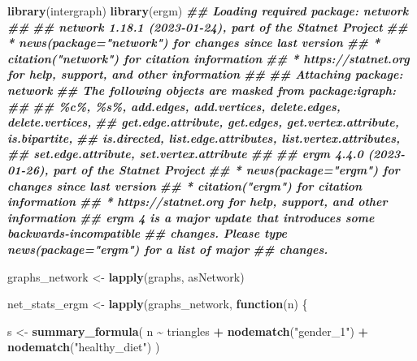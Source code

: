 \documentclass[
]{book}
\newenvironment{Shaded}{\begin{snugshade}}{\end{snugshade}}
\newcommand{\ControlFlowTok}[1]{\textcolor[rgb]{0.13,0.29,0.53}{\textbf{#1}}}
\newcommand{\DocumentationTok}[1]{\textcolor[rgb]{0.56,0.35,0.01}{\textbf{\textit{#1}}}}
\newcommand{\FunctionTok}[1]{\textcolor[rgb]{0.13,0.29,0.53}{\textbf{#1}}}
\newcommand{\NormalTok}[1]{#1}
\newcommand{\OtherTok}[1]{\textcolor[rgb]{0.56,0.35,0.01}{#1}}
\newcommand{\SpecialCharTok}[1]{\textcolor[rgb]{0.81,0.36,0.00}{\textbf{#1}}}
\newcommand{\StringTok}[1]{\textcolor[rgb]{0.31,0.60,0.02}{#1}}
\begin{document}
\begin{Shaded}
\begin{Highlighting}[]
\FunctionTok{library}\NormalTok{(intergraph)}
\FunctionTok{library}\NormalTok{(ergm)}
\DocumentationTok{\#\# Loading required package: network}
\DocumentationTok{\#\# }
\DocumentationTok{\#\# \textquotesingle{}network\textquotesingle{} 1.18.1 (2023{-}01{-}24), part of the Statnet Project}
\DocumentationTok{\#\# * \textquotesingle{}news(package="network")\textquotesingle{} for changes since last version}
\DocumentationTok{\#\# * \textquotesingle{}citation("network")\textquotesingle{} for citation information}
\DocumentationTok{\#\# * \textquotesingle{}https://statnet.org\textquotesingle{} for help, support, and other information}
\DocumentationTok{\#\# }
\DocumentationTok{\#\# Attaching package: \textquotesingle{}network\textquotesingle{}}
\DocumentationTok{\#\# The following objects are masked from \textquotesingle{}package:igraph\textquotesingle{}:}
\DocumentationTok{\#\# }
\DocumentationTok{\#\#     \%c\%, \%s\%, add.edges, add.vertices, delete.edges, delete.vertices,}
\DocumentationTok{\#\#     get.edge.attribute, get.edges, get.vertex.attribute, is.bipartite,}
\DocumentationTok{\#\#     is.directed, list.edge.attributes, list.vertex.attributes,}
\DocumentationTok{\#\#     set.edge.attribute, set.vertex.attribute}
\DocumentationTok{\#\# }
\DocumentationTok{\#\# \textquotesingle{}ergm\textquotesingle{} 4.4.0 (2023{-}01{-}26), part of the Statnet Project}
\DocumentationTok{\#\# * \textquotesingle{}news(package="ergm")\textquotesingle{} for changes since last version}
\DocumentationTok{\#\# * \textquotesingle{}citation("ergm")\textquotesingle{} for citation information}
\DocumentationTok{\#\# * \textquotesingle{}https://statnet.org\textquotesingle{} for help, support, and other information}
\DocumentationTok{\#\# \textquotesingle{}ergm\textquotesingle{} 4 is a major update that introduces some backwards{-}incompatible}
\DocumentationTok{\#\# changes. Please type \textquotesingle{}news(package="ergm")\textquotesingle{} for a list of major}
\DocumentationTok{\#\# changes.}

\NormalTok{graphs\_network }\OtherTok{\textless{}{-}} \FunctionTok{lapply}\NormalTok{(graphs, asNetwork)}

\NormalTok{net\_stats\_ergm }\OtherTok{\textless{}{-}} \FunctionTok{lapply}\NormalTok{(graphs\_network, }\ControlFlowTok{function}\NormalTok{(n) \{}
  
\NormalTok{  s }\OtherTok{\textless{}{-}} \FunctionTok{summary\_formula}\NormalTok{(}
\NormalTok{    n }\SpecialCharTok{\textasciitilde{}}\NormalTok{ triangles }\SpecialCharTok{+}
      \FunctionTok{nodematch}\NormalTok{(}\StringTok{"gender\_1"}\NormalTok{) }\SpecialCharTok{+}
      \FunctionTok{nodematch}\NormalTok{(}\StringTok{"healthy\_diet"}\NormalTok{)}
\NormalTok{    )}
  

\end{Highlighting}
\end{Shaded}
\end{document}
